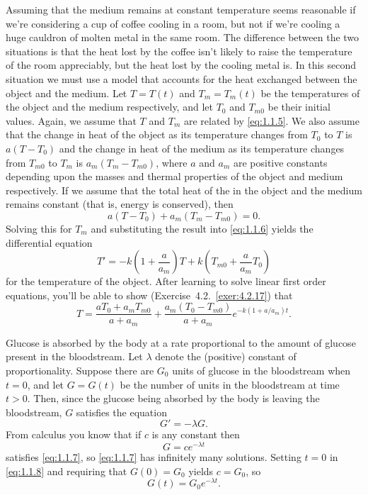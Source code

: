 Assuming that the medium remains at constant temperature seems reasonable if we're considering a cup of coffee cooling in a room, but not if we're cooling a huge cauldron of molten metal in the same room. The difference between the two situations is that the heat lost by the coffee isn't likely to raise the temperature of the room appreciably, but the heat lost by the cooling metal is. In this second situation we must use a model that accounts for the heat exchanged between the object and the medium. Let $T=T(t)$ and $T_{m}=T_{m}(t)$ be the temperatures of the object and the medium respectively, and let $T_{0}$ and $T_{m0}$ be their initial values. Again, we assume that $T$ and $T_{m}$ are related by \eqref{eq:1.1.5}. We also assume that the change in heat of the object as its temperature changes from $T_{0}$ to $T$ is $a(T-T_{0})$ and the change in heat of the medium as its temperature changes from $T_{m0}$ to $T_{m}$ is $a_{m}(T_{m}-T_{m0})$, where $a$ and $a_{m}$ are positive constants depending upon the masses and thermal properties of the object and medium respectively. If we assume that the total heat of the in the object and the medium remains constant (that is, energy is conserved), then
\[
  a(T-T_{0})+a_{m}(T_{m}-T_{m0})=0.
\]
Solving this for $T_{m}$ and substituting the result into \eqref{eq:1.1.6} yields the differential equation
\[
  T'=-k\left(1+\frac{a}{a_{m}}\right)T +k\left(T_{m0}+\frac{a}{a_{m}}T_{0}\right)
\]
for the temperature of the object. After learning to solve linear first order equations, you'll be able to show (Exercise~4.2.~\hspace*{-3pt}\ref{exer:4.2.17}) that
\[
  T=\frac{aT_{0}+a_{m}T_{m0}}{a+a_{m}}+\frac{a_{m}(T_{0}-T_{m0})}{a+a_{m}}e^{-k(1+a/a_{m})t}.
\]


\noindent
Glucose is absorbed by the body at a rate proportional to the amount of glucose present in the bloodstream. Let $\lambda$ denote the (positive) constant of proportionality. Suppose there are $G_{0}$ units of glucose in the bloodstream when $t=0$, and let $G=G(t)$ be the number of units in the bloodstream at time $t>0$. Then, since the glucose being absorbed by the body is leaving the bloodstream, $G$ satisfies the equation
\begin{equation}
  \label{eq:1.1.7}G'=-\lambda G.
\end{equation}
From calculus you know that if $c$ is any constant then
\begin{equation}
  \label{eq:1.1.8}G=ce^{-\lambda t}
\end{equation}
satisfies \eqref{eq:1.1.7}, so \eqref{eq:1.1.7} has infinitely many solutions. Setting $t=0$ in \eqref{eq:1.1.8} and requiring that $G(0)=G_{0}$ yields $c=G_{0}$, so
\[
  G(t)=G_{0}e^{-\lambda t}.
\]

